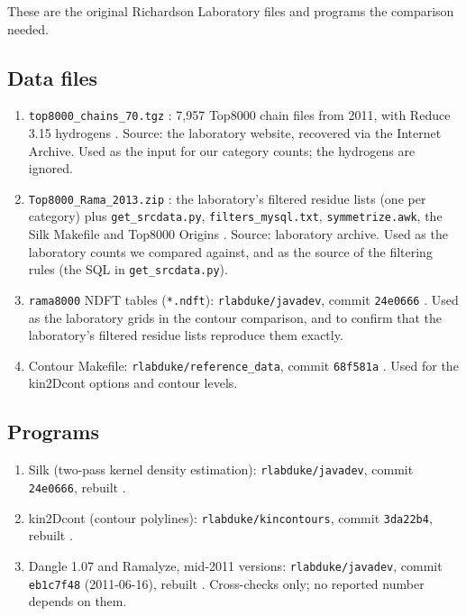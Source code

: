 \documentclass[11pt]{article}
\newcommand{\file}[1]{\texttt{#1}}
\begin{document}
These are the original Richardson Laboratory files and programs the comparison needed.

\subsection*{Data files}
\begin{enumerate}
  \item \file{top8000\_chains\_70.tgz} \cite{Top8000Chains}: 7,957 Top8000 chain files from
    2011, with Reduce 3.15 hydrogens \cite{Word1999,Deis2013}. Source: the laboratory website,
    recovered via the Internet Archive. Used as the input for our category counts; the hydrogens
    are ignored.
  \item \file{Top8000\_Rama\_2013.zip} \cite{Top8000Rama2013}: the laboratory's filtered residue lists (one per category)
    plus \file{get\_srcdata.py}, \file{filters\_mysql.txt}, \file{symmetrize.awk}, the Silk
    Makefile and Top8000 Origins \cite{Keedy2011Origins}. Source: laboratory archive. Used as
    the laboratory counts we compared against, and as the source of the filtering rules (the
    SQL in \file{get\_srcdata.py}).
  \item \file{rama8000} NDFT tables (\file{*.ndft}): \file{rlabduke/javadev}, commit
    \file{24e0666} \cite{javadev}. Used as the laboratory grids in the contour comparison, and to
    confirm that the laboratory's filtered residue lists reproduce them exactly.
  \item Contour Makefile: \file{rlabduke/reference\_data}, commit \file{68f581a}
    \cite{referencedata}. Used for the kin2Dcont options and contour levels.
\end{enumerate}

\subsection*{Programs}
\begin{enumerate}[resume]
  \item Silk (two-pass kernel density estimation): \file{rlabduke/javadev}, commit
    \file{24e0666}, rebuilt \cite{javadev}.
  \item kin2Dcont (contour polylines): \file{rlabduke/kincontours}, commit \file{3da22b4},
    rebuilt \cite{kincontours}.
  \item Dangle 1.07 and Ramalyze, mid-2011 versions: \file{rlabduke/javadev}, commit
    \file{eb1c7f48} (2011-06-16), rebuilt \cite{javadev}. Cross-checks only; no reported number
    depends on them.
\end{enumerate}
\end{document}
